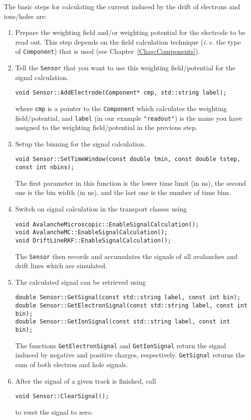 The basic steps for calculating the current induced 
by the drift of electrons and ions/holes are:
\begin{enumerate}
  \item
  Prepare the weighting field and/or weighting potential 
  for the electrode to be read out. 
  This step depends on the field calculation technique 
  (\textit{i.\,e.} the type of \texttt{Component}) that is used 
  (see Chapter~\ref{Chap:Components}). 
  \item
  Tell the \texttt{Sensor} that you want to use this 
  weighting field/potential for the signal calculation. 
\begin{lstlisting}
void Sensor::AddElectrode(Component* cmp, std::string label);
\end{lstlisting}
  where \texttt{cmp} is a pointer to the \texttt{Component} 
  which calculates the weighting field/potential, and \texttt{label} 
  (in our example \texttt{"readout"}) is the name 
  you have assigned to the weighting field/potential in the previous step.
  \item
  Setup the binning for the signal calculation.
\begin{lstlisting}
void Sensor::SetTimeWindow(const double tmin, const double tstep, const int nbins);
\end{lstlisting}
  The first parameter in this function is the lower time limit (in ns), 
  the second one is the bin width (in ns), and the last one 
  is the number of time bins.
  \item
  Switch on signal calculation in the transport classes using 
\begin{lstlisting}
void AvalancheMicroscopic::EnableSignalCalculation();
void AvalancheMC::EnableSignalCalculation();
void DriftLineRKF::EnableSignalCalculation();
\end{lstlisting}
  The \texttt{Sensor} then records and accumulates the signals of all 
  avalanches and drift lines which are simulated.
  \item
  The calculated signal can be retrieved using 
\begin{lstlisting}
double Sensor::GetSignal(const std::string label, const int bin);
double Sensor::GetElectronSignal(const std::string label, const int bin);
double Sensor::GetIonSignal(const std::string label, const int bin); 
\end{lstlisting}
  The functions \texttt{GetElectronSignal} and 
  \texttt{GetIonSignal} return the signal induced by negative 
  and positive charges, respectively. \texttt{GetSignal} returns 
  the sum of both electron and hole signals.   
  \item
  After the signal of a given track is finished, call
\begin{lstlisting}
void Sensor::ClearSignal();
\end{lstlisting}
  to reset the signal to zero.
\end{enumerate}

